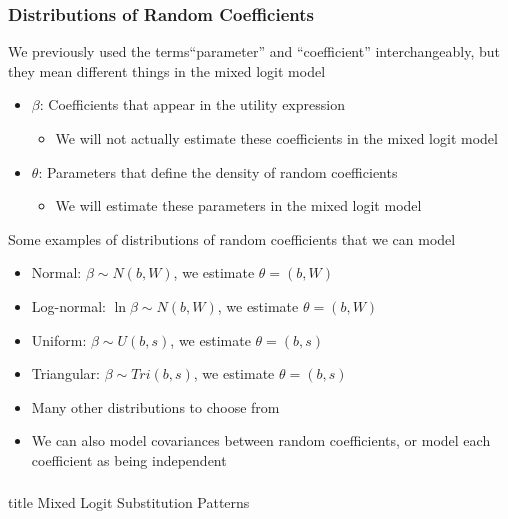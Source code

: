 \documentclass{beamer}
\begin{document}
\begin{frame}\frametitle{Distributions of Random Coefficients}
    We previously used the terms``parameter'' and ``coefficient'' interchangeably, but they mean different things in the mixed logit model
    \begin{itemize}
        \item $\beta$: Coefficients that appear in the utility expression
        \begin{itemize}
            \item We will not actually estimate these coefficients in the mixed logit model
        \end{itemize}
        \item $\theta$: Parameters that define the density of random coefficients
        \begin{itemize}
            \item We will estimate these parameters in the mixed logit model
        \end{itemize}
    \end{itemize}
    \vspace{2ex}
    Some examples of distributions of random coefficients that we can model
    \begin{itemize}
        \item Normal: $\beta \sim N(b, W)$, we estimate $\theta = (b, W)$
        \item Log-normal: $\ln \beta \sim N(b, W)$, we estimate $\theta = (b, W)$
        \item Uniform: $\beta \sim U(b, s)$, we estimate $\theta = (b, s)$
        \item Triangular: $\beta \sim Tri(b, s)$, we estimate $\theta = (b, s)$
        \item Many other distributions to choose from
        \item We can also model covariances between random coefficients, or model each coefficient as being independent
    \end{itemize}
\end{frame}

\begin{frame}\frametitle{}
    \vfill
    \centering
    \begin{beamercolorbox}[center]{title}
        \Large Mixed Logit Substitution Patterns
    \end{beamercolorbox}
    \vfill
\end{frame}
\end{document}
